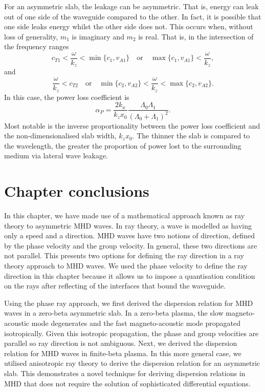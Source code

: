 	For an asymmetric slab, the leakage can be asymmetric. That is, energy can leak out of one side of the waveguide compared to the other. In fact, it is possible that one side leaks energy whilst the other side does not. This occurs when, without loss of generality, $m_1$ is imaginary and $m_2$ is real. That is, in the intersection of the frequency ranges
	\begin{equation}
	c_{T1} < \frac{\omega}{k_z} < \min\{c_1, v_{A1}\} \quad \text{or} \quad \max\{c_1, v_{A1}\} < \frac{\omega}{k_z},
	\end{equation}
	and
	\begin{equation}
	\frac{\omega}{k_z} < c_{T2} \quad \text{or} \quad \min\{c_2, v_{A2}\} < \frac{\omega}{k_z} < \max\{c_2, v_{A2}\}.
	\end{equation}
	In this case, the power loss coefficient is 
	\begin{equation}
	\alpha_P = \frac{2k_x}{k_zx_0}\frac{\Lambda_0\Lambda_1}{(\Lambda_0 + \Lambda_1)^2}.
	\end{equation}
	Most notable is the inverse proportionality between the power loss coefficient and the non-dimensionalised slab width, $k_z x_0$. The thinner the slab is compared to the wavelength, the greater the proportion of power lost to the surrounding medium via lateral wave leakage.
	
	
	\section{Chapter conclusions}
	\label{sec: ray theory conclusions}
	
	In this chapter, we have made use of a mathematical approach known as ray theory to asymmetric MHD waves. In ray theory, a wave is modelled as having only a speed and a direction. MHD waves have two notions of direction, defined by the phase velocity and the group velocity. In general, these two directions are not parallel. This presents two options for defining the ray direction in a ray theory approach to MHD waves. We used the phase velocity to define the ray direction in this chapter because it allows us to impose a quantisation condition on the rays after reflecting of the interfaces that bound the waveguide.
	
	Using the phase ray approach, we first derived the dispersion relation for MHD waves in a zero-beta asymmetric slab. In a zero-beta plasma, the slow magneto-acoustic mode degenerates and the fast magneto-acoustic mode propagated isotropically. Given this isotropic propagation, the phase and group velocities are parallel so ray direction is not ambiguous. Next, we derived the dispersion relation for MHD waves in finite-beta plasma. In this more general case, we utilised anisotropic ray theory to derive the dispersion relation for an asymmetric slab. This demonstrates a novel technique for deriving dispersion relations in MHD that does not require the solution of sophisticated differential equations.
	
